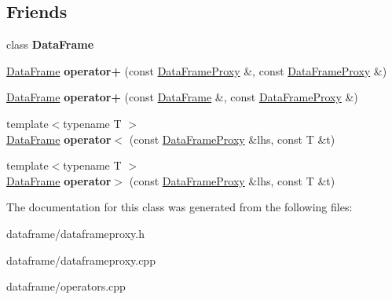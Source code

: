 \subsection*{Friends}
\begin{DoxyCompactItemize}
\item 
\mbox{\label{classDataFrame_1_1DataFrameProxy_ac3cf826bc43b8ab4740915b5c60e7166}} 
class {\bfseries Data\+Frame}
\item 
\mbox{\label{classDataFrame_1_1DataFrameProxy_ac7252ac5b8145feb97ce0b16040cdbde}} 
\hyperlink{classDataFrame}{Data\+Frame} {\bfseries operator+} (const \hyperlink{classDataFrame_1_1DataFrameProxy}{Data\+Frame\+Proxy} \&, const \hyperlink{classDataFrame_1_1DataFrameProxy}{Data\+Frame\+Proxy} \&)
\item 
\mbox{\label{classDataFrame_1_1DataFrameProxy_a32fc0676af70bd35bf83e11c9ab946fc}} 
\hyperlink{classDataFrame}{Data\+Frame} {\bfseries operator+} (const \hyperlink{classDataFrame}{Data\+Frame} \&, const \hyperlink{classDataFrame_1_1DataFrameProxy}{Data\+Frame\+Proxy} \&)
\item 
\mbox{\label{classDataFrame_1_1DataFrameProxy_aaa1e3264e141ab931043d7f50c784394}} 
{\footnotesize template$<$typename T $>$ }\\\hyperlink{classDataFrame}{Data\+Frame} {\bfseries operator$<$} (const \hyperlink{classDataFrame_1_1DataFrameProxy}{Data\+Frame\+Proxy} \&lhs, const T \&t)
\item 
\mbox{\label{classDataFrame_1_1DataFrameProxy_a32bee46933cf3c0a26f549928805ba22}} 
{\footnotesize template$<$typename T $>$ }\\\hyperlink{classDataFrame}{Data\+Frame} {\bfseries operator$>$} (const \hyperlink{classDataFrame_1_1DataFrameProxy}{Data\+Frame\+Proxy} \&lhs, const T \&t)
\end{DoxyCompactItemize}


The documentation for this class was generated from the following files\+:\begin{DoxyCompactItemize}
\item 
dataframe/dataframeproxy.\+h\item 
dataframe/dataframeproxy.\+cpp\item 
dataframe/operators.\+cpp\end{DoxyCompactItemize}
